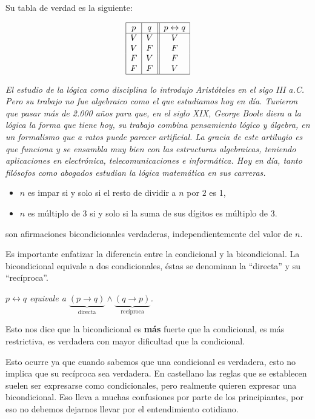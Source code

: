 Su tabla de verdad es la siguiente:

$$\begin{array}{|c|c||c|}
	\hline
	p& q& p\leftrightarrow q \cr
	\hline
	V&V&V\cr
	V&F&F\cr
	F&V&F\cr
	F&F&V\cr
	\hline
\end{array}$$


{\em El estudio de la lógica como disciplina lo introdujo Aristóteles en el sigo III a.C. Pero su trabajo no fue algebraico como el que estudiamos hoy en día. Tuvieron que pasar más de 2.000 años para que, en el siglo XIX, George Boole diera a la lógica la forma que tiene hoy, su trabajo combina pensamiento lógico y álgebra, en un formalismo que a ratos puede parecer artificial.
La gracia de este artilugio es que funciona y se ensambla muy bien con las estructuras algebraicas, teniendo aplicaciones en electrónica, telecomunicaciones e informática. Hoy en día, tanto filósofos como abogados estudian la lógica matemática en sus carreras.}


\begin{ejemplo}\leavevmode
	\begin{itemize}
		\item $n$ es impar si y solo si el resto de dividir a $n$ por $2$ es 1,
		\item $n$ es múltiplo de 3 si y solo si la suma de sus dígitos es múltiplo de 3.
	\end{itemize}
	son afirmaciones bicondicionales verdaderas, independientemente del valor de $n$. 

\end{ejemplo}

Es importante enfatizar la diferencia entre la condicional y la bicondicional.
La bicondicional equivale a dos condicionales, 
\'estas se denominan la ``directa'' y su ``recíproca''.

\medskip

\centerline{\em $p\leftrightarrow q$ equivale a $\underbrace{(p\rightarrow q)}_{\textrm{directa}}\wedge\underbrace{(q\rightarrow p)}_{\textrm{recíproca}}$.}

Esto nos dice que la bicondicional es \textbf{más} fuerte que la condicional, es más restrictiva, es verdadera con mayor dificultad que la condicional.

Esto ocurre ya que cuando sabemos que una condicional es verdadera, 
esto no implica que su recíproca sea verdadera.
En castellano las reglas que se establecen suelen ser expresarse 
como condicionales, pero realmente quieren expresar una bicondicional. 
Eso lleva a muchas confusiones por parte de los principiantes, 
por eso no debemos dejarnos llevar por el entendimiento cotidiano.

